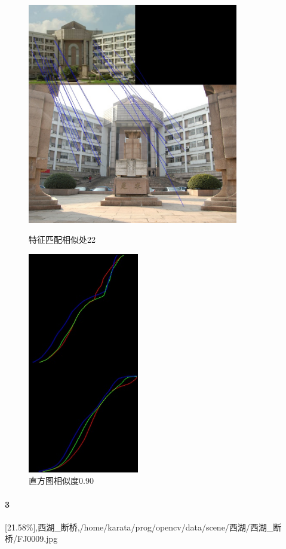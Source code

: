 \begin{figure}[htb]
\begin{minipage}[t]{0.5\linewidth}
\centering
\includegraphics[height=3.8in]{玉泉曹楼.jpg.d/im2sift.jpg}
\caption{特征匹配相似处22}
\label{fig:side:a}
\end{minipage}%
\begin{minipage}[t]{0.5\linewidth}
\centering
\includegraphics[height=3.8in]{玉泉曹楼.jpg.d/im2hist2.jpg}
\caption{直方图相似度0.90}
\label{fig:side:a}
\end{minipage}%
\end{figure}

\paragraph{3}
[21.58\%],西湖_断桥,/home/karata/prog/opencv/data/scene/西湖/西湖_断桥/FJ0009.jpg

